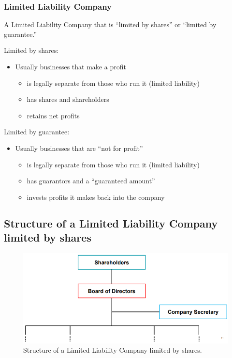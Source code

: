 \subsubsection{Limited Liability Company}
A Limited Liability Company that is ``limited by shares'' or ``limited by guarantee.''

Limited by shares:
\begin{itemize}
    \item Usually businesses that make a profit
          \begin{itemize}
              \item is legally separate from those who run it (limited liability)
              \item has shares and shareholders
              \item retains net profits
          \end{itemize}
\end{itemize}

Limited by guarantee:
\begin{itemize}
    \item Usually businesses that are ``not for profit''
          \begin{itemize}
              \item is legally separate from those who run it (limited liability)
              \item has guarantors and a ``guaranteed amount''
              \item invests profits it makes back into the company
          \end{itemize}
\end{itemize}
\subsection{Structure of a Limited Liability Company limited by shares}
\begin{figure}[H]
    \centering
    \includegraphics[width = \textwidth]{./img/figure26.png}
    \caption{Structure of a Limited Liability Company limited by shares.}
\end{figure}
